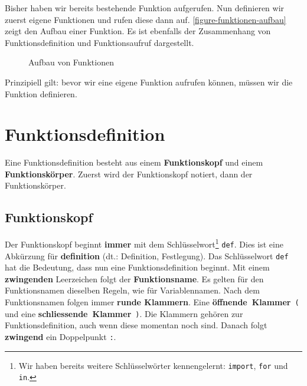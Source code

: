 Bisher haben wir  bereits bestehende Funktion aufgerufen. Nun definieren wir zuerst eigene Funktionen und rufen diese dann auf. \autoref{figure-funktionen-aufbau} zeigt den Aufbau einer Funktion. Es ist ebenfalls der Zusammenhang von Funktionsdefinition und Funktionsaufruf dargestellt.

\begin{figure}[htb]
\centering
{}
\caption{Aufbau von Funktionen}
\label{figure-funktionen-aufbau}
\end{figure}

\begin{important}
Prinzipiell gilt: bevor wir eine eigene Funktion aufrufen können, müssen wir die Funktion definieren.
\end{important}

\section{Funktionsdefinition}

Eine Funktionsdefinition besteht aus einem \textbf{Funktionskopf} und einem \textbf{Funktionskörper}. Zuerst wird der Funktionskopf notiert, dann der Funktionskörper.

\subsection{Funktionskopf}

Der Funktionskopf beginnt \textbf{immer} mit dem Schlüsselwort\footnote{Wir haben bereits weitere Schlüsselwörter kennengelernt: \lstinline{import}, \lstinline{for} und \lstinline{in}.} \lstinline{def}. Dies ist eine Abkürzung für \textbf{definition} (dt.: Definition, Festlegung). Das Schlüsselwort \lstinline{def} hat die Bedeutung, dass nun eine Funktionsdefinition beginnt. Mit einem \textbf{zwingenden} Leerzeichen folgt der \textbf{Funktionsname}. Es gelten für den Funktionsnamen dieselben Regeln, wie für Variablennamen. Nach dem Funktionsnamen folgen immer \textbf{runde Klammern}. Eine \mbox{\textbf{öffnende Klammer} \lstinline{(}} und eine \mbox{\textbf{schliessende Klammer} \lstinline{)}}. Die Klammern gehören zur Funktionsdefinition, auch wenn diese momentan noch  sind. Danach folgt \textbf{zwingend} ein Doppelpunkt \lstinline{:}.

